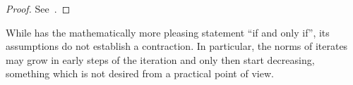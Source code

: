 \begin{proof}
  See~\cite[Theorem 3.1]{Rannacher18nla}.
\end{proof}

\begin{remark}
  While  has the
  mathematically more pleasing statement ``if and only if'', its
  assumptions do not establish a contraction. In particular, the norms
  of iterates may grow in early steps of the iteration and only then
  start decreasing, something which is not desired from a practical
  point of view.
\end{remark}

